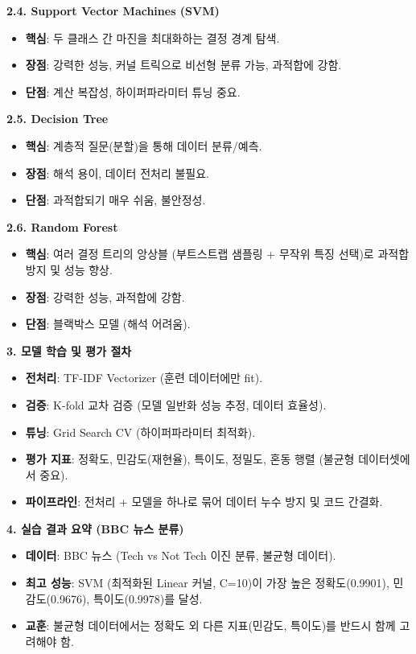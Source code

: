 \documentclass[11pt,a4paper]{article}
\begin{document}
\begin{tcolorbox}[title=\textbf{CSCI89 Lecture 9: 고전적 머신러닝 핵심 요약}, colback=myblue!10, colframe=blue!75!black, boxrule=0.8pt, arc=4pt]
\textbf{2.4. Support Vector Machines (SVM)}
\begin{itemize}
    \item \textbf{핵심}: 두 클래스 간 마진을 최대화하는 결정 경계 탐색.
    \item \textbf{장점}: 강력한 성능, 커널 트릭으로 비선형 분류 가능, 과적합에 강함.
    \item \textbf{단점}: 계산 복잡성, 하이퍼파라미터 튜닝 중요.
\end{itemize}

\textbf{2.5. Decision Tree}
\begin{itemize}
    \item \textbf{핵심}: 계층적 질문(분할)을 통해 데이터 분류/예측.
    \item \textbf{장점}: 해석 용이, 데이터 전처리 불필요.
    \item \textbf{단점}: 과적합되기 매우 쉬움, 불안정성.
\end{itemize}

\textbf{2.6. Random Forest}
\begin{itemize}
    \item \textbf{핵심}: 여러 결정 트리의 앙상블 (부트스트랩 샘플링 + 무작위 특징 선택)로 과적합 방지 및 성능 향상.
    \item \textbf{장점}: 강력한 성능, 과적합에 강함.
    \item \textbf{단점}: 블랙박스 모델 (해석 어려움).
\end{itemize}

\textbf{3. 모델 학습 및 평가 절차}
\begin{itemize}
    \item \textbf{전처리}: TF-IDF Vectorizer (훈련 데이터에만 fit).
    \item \textbf{검증}: K-fold 교차 검증 (모델 일반화 성능 추정, 데이터 효율성).
    \item \textbf{튜닝}: Grid Search CV (하이퍼파라미터 최적화).
    \item \textbf{평가 지표}: 정확도, 민감도(재현율), 특이도, 정밀도, 혼동 행렬 (불균형 데이터셋에서 중요).
    \item \textbf{파이프라인}: 전처리 + 모델을 하나로 묶어 데이터 누수 방지 및 코드 간결화.
\end{itemize}

\textbf{4. 실습 결과 요약 (BBC 뉴스 분류)}
\begin{itemize}
    \item \textbf{데이터}: BBC 뉴스 (Tech vs Not Tech 이진 분류, 불균형 데이터).
    \item \textbf{최고 성능}: SVM (최적화된 Linear 커널, C=10)이 가장 높은 정확도(0.9901), 민감도(0.9676), 특이도(0.9978)를 달성.
    \item \textbf{교훈}: 불균형 데이터에서는 정확도 외 다른 지표(민감도, 특이도)를 반드시 함께 고려해야 함.
\end{itemize}
\end{tcolorbox}
\end{document}
